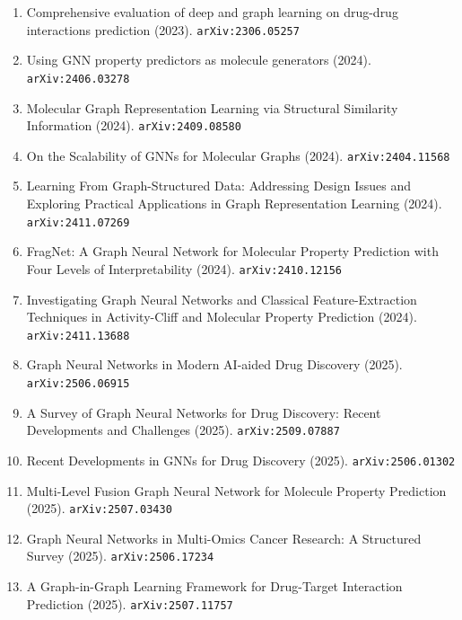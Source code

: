\documentclass[11pt]{article}
\begin{document}
\begin{enumerate}
  \item Comprehensive evaluation of deep and graph learning on drug-drug
  interactions prediction (2023). \texttt{arXiv:2306.05257}
  \item Using GNN property predictors as molecule generators (2024). \texttt{arXiv:2406.03278}
  \item Molecular Graph Representation Learning via Structural Similarity
  Information (2024). \texttt{arXiv:2409.08580}
  \item On the Scalability of GNNs for Molecular Graphs (2024). \texttt{arXiv:2404.11568}
  \item Learning From Graph-Structured Data: Addressing Design Issues and
  Exploring Practical Applications in Graph Representation Learning (2024). \texttt{arXiv:2411.07269}
  \item FragNet: A Graph Neural Network for Molecular Property Prediction with Four Levels of Interpretability (2024). \texttt{arXiv:2410.12156}
  \item Investigating Graph Neural Networks and Classical Feature-Extraction
  Techniques in Activity-Cliff and Molecular Property Prediction (2024). \texttt{arXiv:2411.13688}
  \item Graph Neural Networks in Modern AI-aided Drug Discovery (2025). \texttt{arXiv:2506.06915}
  \item A Survey of Graph Neural Networks for Drug Discovery: Recent Developments and Challenges (2025). \texttt{arXiv:2509.07887}
  \item Recent Developments in GNNs for Drug Discovery (2025). \texttt{arXiv:2506.01302}
  \item Multi-Level Fusion Graph Neural Network for Molecule Property Prediction (2025). \texttt{arXiv:2507.03430}
  \item Graph Neural Networks in Multi-Omics Cancer Research: A Structured Survey (2025). \texttt{arXiv:2506.17234}
  \item A Graph-in-Graph Learning Framework for Drug-Target Interaction Prediction (2025). \texttt{arXiv:2507.11757}
\end{enumerate}
\end{document}
